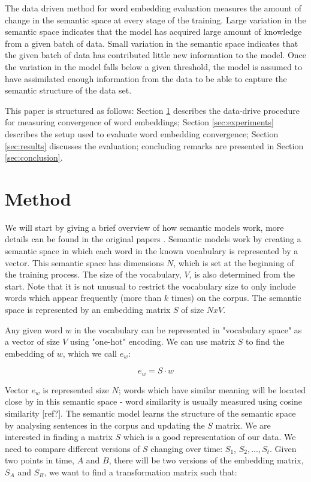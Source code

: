 \documentclass{article} %
\begin{document}
The data driven method for word embedding evaluation measures the amount of change in the semantic space at every stage of the training. Large variation in the semantic space indicates that the model has acquired large amount of knowledge from a given batch of data. Small variation in the semantic space indicates that the given batch of data has contributed little new information to the model. Once the variation in the model falls below a given threshold, the model is assumed to have assimilated enough information from the data to be able to capture the semantic structure of the data set.

This paper is structured as follows: Section \ref{sec:method} describes the data-drive procedure for measuring convergence of word embeddings; Section \ref{sec:experiments} describes the setup used to evaluate word embedding convergence; Section \ref{sec:results} discusses the evaluation; concluding remarks are presented in Section \ref{sec:conclusion}.

\section{Method}
\label{sec:method}

We will start by giving a brief overview of how semantic models work, more details can be found in the original papers \cite{Mikolov_CS2013}. Semantic models work by creating a semantic space in which each word in the known vocabulary is represented by a vector. This semantic space has dimensions $N$, which is set at the beginning of the training process. The size of the vocabulary, $V$, is also determined from the start. Note that it is not unusual to restrict the vocabulary size to only include words which appear frequently (more than $k$ times) on the corpus. The semantic space is represented by an embedding matrix $S$ of size $NxV$.

Any given word $w$ in the vocabulary can be represented in "vocabulary space" as a vector of size $V$ using "one-hot" encoding. We can use matrix $S$ to find the embedding of $w$, which we call $e_w$:

$$e_w = S \cdot w$$

Vector $e_w$ is represented size $N$; words which have similar meaning will be located close by in this semantic space - word similarity is usually measured using cosine similarity [ref?]. The semantic model learns the structure of the semantic space by analysing sentences in the corpus and updating the $S$ matrix. We are interested in finding a matrix $S$ which is a good representation of our data. We need to compare different versions of $S$ changing over time: $S_1$, $S_2, ..., S_t$. Given two points in time, $A$ and $B$, there will be two versions of the embedding matrix, $S_A$ and $S_B$, we want to find a transformation matrix such that:
\end{document}
